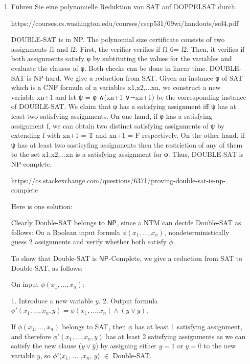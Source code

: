 \documentclass{bschlangaul-aufgabe}
\begin{document}
\begin{enumerate}


\item Führen Sie eine polynomielle Reduktion von SAT auf DOPPELSAT durch.

\begin{bAntwort}
https://courses.cs.washington.edu/courses/csep531/09wi/handouts/sol4.pdf

DOUBLE-SAT is in NP. The polynomial size certificate consists of two
assignments f1 and f2. First, the verifier verifies if f1 6= f2. Then,
it verifies if both assignments satisfy φ by subtituting the values for
the variables and evaluate the clauses of φ. Both checks can be done in
linear time. DOUBLE-SAT is NP-hard. We give a reduction from SAT. Given
an instance φ of SAT which is a CNF formula of n variables x1,x2,...xn,
we construct a new variable xn+1 and let ψ = φ ∧(xn+1 ∨¬xn+1) be the
corresponding instance of DOUBLE-SAT. We claim that φ has a satisfying
assignment iff ψ has at least two satisfying assignments. On one hand,
if φ has a satisfying assignment f, we can obtain two distinct
satisfying assignments of ψ by extending f with xn+1 = T and xn+1 = F
respectively. On the other hand, if ψ has at least two sastisyfing
assignments then the restriction of any of them to the set {x1,x2,...xn}
is a satisfying assignment for φ. Thus, DOUBLE-SAT is NP-complete.

https://cs.stackexchange.com/questions/6371/proving-double-sat-is-np-complete

Here is one solution:

Clearly Double-SAT belongs to ${\sf NP}$, since a NTM can decide
Double-SAT as follows: On a Boolean input formula
$\phi(x_1,\ldots,x_n)$, nondeterministically guess 2 assignments and
verify whether both satisfy $\phi$.

To show that Double-SAT is ${\sf NP}$-Complete, we give a reduction from
SAT to Double-SAT, as follows:

On input $\phi(x_1,\ldots,x_n)$:

1. Introduce a new variable $y$.
2. Output formula $\phi'(x_1,\ldots,x_n, y) = \phi(x_1,\ldots,x_n) \wedge (y \vee \bar y)$.

If $\phi (x_1,\ldots,x_n)$ belongs to SAT, then $\phi$ has at least 1
satisfying assignment, and therefore $\phi'(x_1,\ldots,x_n, y)$ has at
least 2 satisfying assignments as we can satisfy the new clause ($y \vee
\bar y$) by assigning either $y = 1$ or $y = 0$ to the new variable $y$,
so $\phi'$($x_1$, ... ,$x_n$, $y$) $\in$ Double-SAT.


\end{bAntwort}
\end{enumerate}
\end{document}
